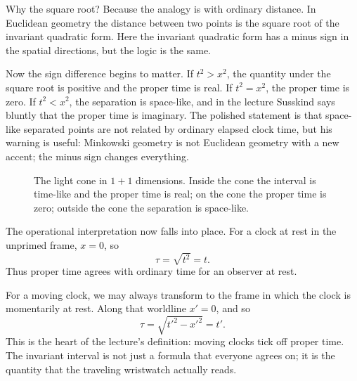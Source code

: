 Why the square root? Because the analogy is with ordinary distance. In Euclidean geometry the distance between two points is the square root of the invariant quadratic form. Here the invariant quadratic form has a minus sign in the spatial directions, but the logic is the same.

Now the sign difference begins to matter. If \(t^2>x^2\), the quantity under the square root is positive and the proper time is real. If \(t^2=x^2\), the proper time is zero. If \(t^2<x^2\), the separation is space-like, and in the lecture Susskind says bluntly that the proper time is imaginary. The polished statement is that space-like separated points are not related by ordinary elapsed clock time, but his warning is useful: Minkowski geometry is not Euclidean geometry with a new accent; the minus sign changes everything.

\begin{figure}[h]
\centering
{}
\caption{The light cone in \(1+1\) dimensions. Inside the cone the interval is time-like and the proper time is real; on the cone the proper time is zero; outside the cone the separation is space-like.}
\end{figure}

The operational interpretation now falls into place. For a clock at rest in the unprimed frame, \(x=0\), so
\begin{equation}
\tau=\sqrt{t^2}=t.
\end{equation}
Thus proper time agrees with ordinary time for an observer at rest.

For a moving clock, we may always transform to the frame in which the clock is momentarily at rest. Along that worldline \(x'=0\), and so
\begin{equation}
\tau=\sqrt{t'^2-x'^2}=t'.
\end{equation}
This is the heart of the lecture's definition: moving clocks tick off proper time. The invariant interval is not just a formula that everyone agrees on; it is the quantity that the traveling wristwatch actually reads.

